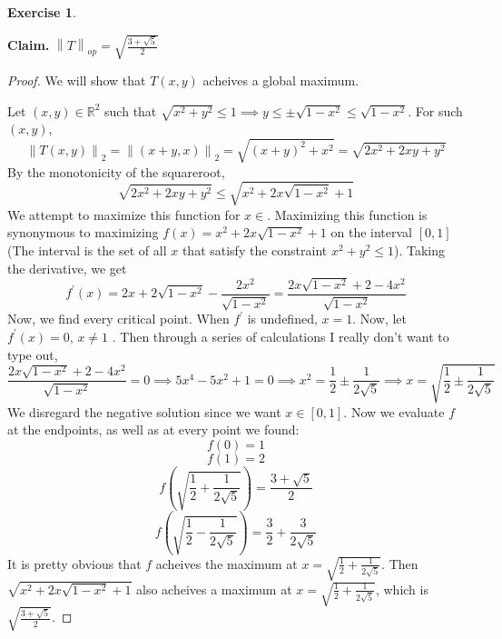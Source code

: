 \documentclass{article}
\theoremstyle{plain} %
\numberwithin{thm}{section} %
\theoremstyle{definition}
\newtheorem{exercise}[thm]{Exercise} %
\begin{document}
\begin{exercise}
\begin{enumerate}[label=(\alph*)]
            \textbf{Claim.} \(\left\lVert T \right\rVert _{op} = \sqrt{\frac{3+\sqrt{5}}{2}} \)

            \begin{proof}
                We will show that \(T(x,y)\) acheives a global maximum.
                
                Let \((x,y) \in \mathbb{R} ^2\) such that \(\sqrt{x^2 + y^2} \leq 1 \implies y \leq \pm \sqrt{1-x^2} \leq \sqrt{1-x^2}\).
                For such \((x,y)\),
                \[
                    \left\lVert T(x,y) \right\rVert _2 = \left\lVert (x+y, x) \right\rVert _2 = \sqrt{(x+y)^2 + x^2} = \sqrt{2x^2 + 2xy + y^2} 
                \]
                By the monotonicity of the squareroot,
                \[
                    \sqrt{2x^2 + 2xy + y^2} \leq \sqrt{x^2 + 2x\sqrt{1-x^2} + 1}
                \]
                We attempt to maximize this function for \(x \in \). Maximizing this function is synonymous to maximizing \(f(x) = x^2 + 2x\sqrt{1-x^2} + 1\) on the interval \([0,1]\) (The interval is the set of all \(x\) that satisfy the constraint \(x^2 + y^2 \leq 1\)). Taking the derivative, we get
                \[
                    f^\prime(x) = 2x + 2\sqrt{1-x^2} -\frac{2x^2}{\sqrt{1-x^2}} = \frac{2x\sqrt{1-x^2} + 2 - 4x^2}{\sqrt{1-x^2}}
                \]
                Now, we find every critical point. When \(f^\prime\) is undefined, \(x = 1\).
                Now, let \(f^\prime(x) = 0\), \(x\neq 1\) . Then through a series of calculations I really don't want to type out,
                \[
                    \frac{2x\sqrt{1-x^2} + 2 - 4x^2}{\sqrt{1-x^2}} = 0 \implies 5x^4 - 5x^2 + 1 = 0 \implies x^2 = \frac{1}{2}\pm\frac{1}{2\sqrt{5}} \implies x = \sqrt{\frac{1}{2}\pm\frac{1}{2\sqrt{5}}} 
                \]
                We disregard the negative solution since we want \(x \in [0,1]\).
                Now we evaluate \(f\) at the endpoints, as well as at every point we found:
                \[
                    f(0) = 1
                \]
                \[
                    f(1) = 2
                \]
                \[
                    f\left(\sqrt{\frac{1}{2}+\frac{1}{2\sqrt{5}}}\right) = \frac{3+\sqrt{5}}{2}
                \]
                \[
                    f\left(\sqrt{\frac{1}{2}-\frac{1}{2\sqrt{5}}}\right) = \frac{3}{2}+\frac{3}{2\sqrt{5}}
                \]
                It is pretty obvious that \(f\) acheives the maximum at \(x = \sqrt{\frac{1}{2}+\frac{1}{2\sqrt{5}}}\). Then \(\sqrt{x^2 + 2x\sqrt{1-x^2} + 1}\) also acheives a maximum at \(x = \sqrt{\frac{1}{2}+\frac{1}{2\sqrt{5}}}\), which is \(\sqrt{\frac{3+\sqrt{5}}{2}}\).


\end{proof}
\end{enumerate}
\end{exercise}
\end{document}
